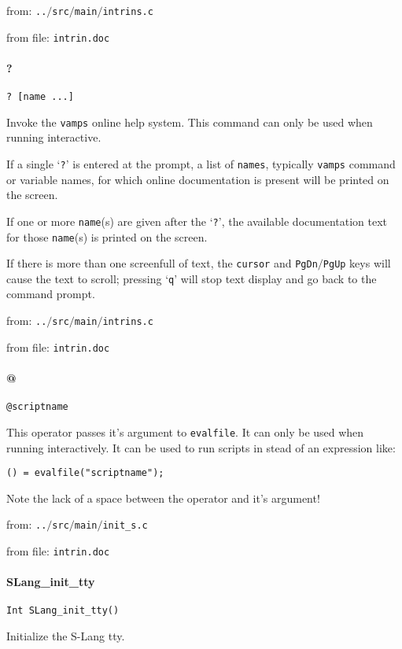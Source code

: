 from: {\tt ..$/$src$/$main$/$intrins.c}

from file: {\tt intrin.doc}


\paragraph{?}
\begin{verbatim}
? [name ...]
\end{verbatim}
Invoke the {\tt vamps} online help system. This command can
only be used when running interactive.


If a single `{\tt ?}' is entered at the prompt, a list of
{\tt names}, typically {\tt vamps} command or variable names, for
which online documentation is present will be printed on
the screen.


If one or more {\tt name}(s) are given after the `{\tt ?}', the
available documentation text for those {\tt name}(s) is printed
on the screen.


If there is more than one screenfull of text, the {\tt cursor}
and {\tt PgDn$/$PgUp} keys will cause the text to scroll; pressing
`{\tt q}' will stop text display and go back to the command
prompt.


from: {\tt ..$/$src$/$main$/$intrins.c}

from file: {\tt intrin.doc}


\paragraph{@}
\begin{verbatim}
@scriptname
\end{verbatim}
This operator passes it's argument to {\tt evalfile}. It
can only be used when running interactively. It
can be used to run scripts in stead of an expression
like:
\begin{verbatim}
() = evalfile("scriptname");
\end{verbatim}
Note the lack of a space between the operator and it's
argument!


from: {\tt ..$/$src$/$main$/$init\_s.c}

from file: {\tt intrin.doc}


\paragraph{SLang\_init\_tty}
\begin{verbatim}
Int SLang_init_tty()
\end{verbatim}
Initialize the S-Lang tty. 


